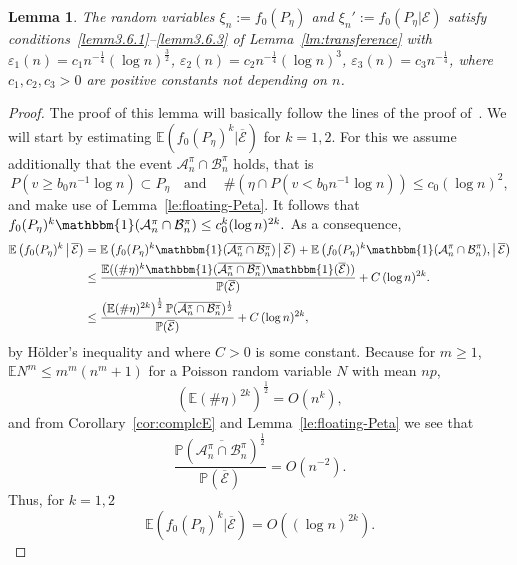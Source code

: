 \documentclass[10pt]{amsart}
\newtheorem{lemm}[theo]{Lemma}\newtheorem{prop}[theo]{Proposition}\newtheorem{coro}[theo]{Corollary}\newtheorem{conj}[theo]{Conjecture}
\theoremstyle{definition}\newtheorem{defi}[theo]{Definition}\newtheorem{rema}[theo]{Remark}\newtheorem{exam}[theo]{Example}\newtheorem{exem}[theo]{Example}\newtheorem{nota}[theo]{Notation}
\newcommand{\ind}{\mathbbm{1}}
\newcommand{\bbE}{\mathbb{E}}
\newcommand{\bbP}{\mathbb{P}}
\newcommand{\clA}{\mathcal{A}}
\newcommand{\clB}{\mathcal{B}}
\newcommand{\clE}{\mathcal{E}}
\begin{document}
\begin{lemm}\label{lm:condition}
The random variables $\xi_n:=f_0(P_{\eta})$ and $\xi_n':=f_0(P_{\eta}|\clE)$ satisfy conditions~\eqref{lemm3.6.1}--\eqref{lemm3.6.3} of Lemma~\ref{lm:transference} with $\varepsilon_1(n)=c_1n^{-\frac 14} (\log n)^{\frac 32}$, $\varepsilon_2(n)=c_2n^{-\frac 14} (\log n)^3$, $\varepsilon_3(n)=c_3 n^{-\frac 14}$, where $c_1,c_2,c_3>0$ are positive constants not depending on $n$.
\end{lemm}


\begin{proof}
The proof of this lemma will basically follow the lines of the proof of~\cite[Lemma~8.2]{BR10}. We will start by estimating $\bbE(f_0(P_{\eta})^k|\overline{\clE})$ for $k=1,2$. For this we assume additionally that the event $\clA^\pi_n \cap \clB^\pi_n$ holds, that is
\[
P\left(v\ge b_0 n^{-1} \log n\right)\subset P_{\eta}\quad\text{and}\quad \ \#\left(\eta \cap P\left(v< b_0 n^{-1} \log n\right)\right)\leq c_0 (\log n)^2,
\]
and make use of Lemma~\ref{le:floating-Peta}. It follows that $ f_0(P_{\eta})^k \ind (\clA^\pi_n \cap \clB^\pi_n) \leq c_0^{k} (\log n)^{2k}. $ As a consequence,
\begin{align*}
\bbE\left(f_0(P_{\eta})^k\,\middle|\,\overline{\clE}\right)&=\bbE\left(f_0(P_{\eta})^k \ind (\overline{\clA^\pi_n \cap \clB^\pi_n})\,\middle|\,\overline{\clE}\right)+ \bbE\left(f_0(P_{\eta})^k\ind (\clA^\pi_n \cap \clB^\pi_n),\middle|\,\overline{\clE}\right)
\\ &\leq
\frac{\bbE((\# \eta)^k \ind (\overline{\clA^\pi_n \cap \clB^\pi_n}) \ind (\overline{\clE}))}{\bbP(\overline{\clE})}+ C\,(\log n)^{2k}.
\\ &\leq
\frac{\left(\bbE(\# \eta)^{2k}\right)^{\frac12} \bbP (\overline{\clA^\pi_n \cap \clB^\pi_n})^{\frac 12}}{\bbP(\overline{\clE})}+ C\,(\log n)^{2k},
\end{align*}
by H\"older's inequality and where $C>0$ is some constant. Because for $m \geq 1$, $\bbE N^{m} \leq m^m (n^m+1)$ for a Poisson random variable $N$ with mean $np$,
\[
\left(\bbE(\# \eta)^{2k}\right)^{\frac12} = O(n^{k}),
\]
and from Corollary~\ref{cor:complcE} and Lemma~\ref{le:floating-Peta} we see that
\[
\frac{\bbP(\overline{\clA^\pi_n \cap \clB^\pi_n})^{\frac 12}}{\bbP(\overline{\clE})} = O\left(n^{- 2}\right).
\]
Thus, for $k=1,2$
\begin{equation}\label{eq:3}
\bbE(f_0(P_{\eta})^k|\overline{\clE}) = O\left((\log n)^{2k}\right).
\end{equation}


\end{proof}
\end{document}
